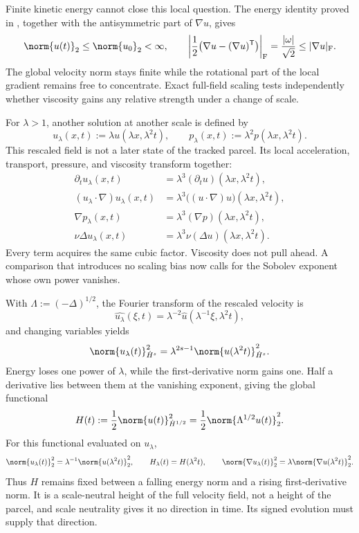 Finite kinetic energy cannot close this local question. The energy identity proved in , together with the antisymmetric part of \(\nabla u\), gives
\[
  \norm{u(t)}_2
  \leq
  \norm{u_0}_2
  <\infty,
  \qquad
  \left|\frac12\bigl(\nabla u-(\nabla u)^{\mathsf T}\bigr)\right|_{\mathrm F}
  =
  \frac{|\omega|}{\sqrt2}
  \leq
  |\nabla u|_{\mathrm F}.
\]
The global velocity norm stays finite while the rotational part of the local gradient remains free to concentrate. Exact full-field scaling tests independently whether viscosity gains any relative strength under a change of scale.


For \(\lambda>1\), another solution at another scale is defined by
\[
  u_\lambda(x,t)
  :=
  \lambda u(\lambda x,\lambda^2t),
  \qquad
  p_\lambda(x,t)
  :=
  \lambda^2p(\lambda x,\lambda^2t).
\]
This rescaled field is not a later state of the tracked parcel. Its local acceleration, transport, pressure, and viscosity transform together:
\[
\begin{aligned}
  \partial_tu_\lambda(x,t)
  &=
  \lambda^3(\partial_tu)(\lambda x,\lambda^2t),
  \\
  (u_\lambda\cdot\nabla)u_\lambda(x,t)
  &=
  \lambda^3\bigl((u\cdot\nabla)u\bigr)(\lambda x,\lambda^2t),
  \\
  \nabla p_\lambda(x,t)
  &=
  \lambda^3(\nabla p)(\lambda x,\lambda^2t),
  \\
  \nu\Delta u_\lambda(x,t)
  &=
  \lambda^3\nu(\Delta u)(\lambda x,\lambda^2t).
\end{aligned}
\]
Every term acquires the same cubic factor. Viscosity does not pull ahead. A comparison that introduces no scaling bias now calls for the Sobolev exponent whose own power vanishes.


With \(\Lambda:=(-\Delta)^{1/2}\), the Fourier transform of the rescaled velocity is
\[
  \widehat{u_\lambda}(\xi,t)
  =
  \lambda^{-2}\widehat u(\lambda^{-1}\xi,\lambda^2t),
\]
and changing variables yields
\[
  \norm{u_\lambda(t)}_{\dot H^s}^2
  =
  \lambda^{2s-1}
  \norm{u(\lambda^2t)}_{\dot H^s}^2.
\]
Energy loses one power of \(\lambda\), while the first-derivative norm gains one. Half a derivative lies between them at the vanishing exponent, giving the global functional
\[
  H(t)
  :=
  \frac12\norm{u(t)}_{\dot H^{1/2}}^2
  =
  \frac12\norm{\Lambda^{1/2}u(t)}_2^2.
\]
For this functional evaluated on \(u_\lambda\),
\[
  \norm{u_\lambda(t)}_2^2
  =
  \lambda^{-1}\norm{u(\lambda^2t)}_2^2,
  \qquad
  H_\lambda(t)=H(\lambda^2t),
  \qquad
  \norm{\nabla u_\lambda(t)}_2^2
  =
  \lambda\norm{\nabla u(\lambda^2t)}_2^2.
\]
Thus \(H\) remains fixed between a falling energy norm and a rising first-derivative norm. It is a scale-neutral height of the full velocity field, not a height of the parcel, and scale neutrality gives it no direction in time. Its signed evolution must supply that direction.

